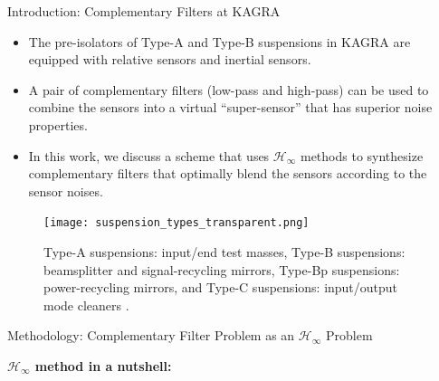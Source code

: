 \documentclass{beamer}
\begin{document}
\begin{frame}[t]
	\begin{columns}[t]
		
		\begin{column}{0.32\linewidth}	
			\begin{block}{Introduction: Complementary Filters at KAGRA}
				\begin{itemize}
					\item The pre-isolators of Type-A and Type-B suspensions in KAGRA are equipped with relative sensors and inertial sensors.
					\item A pair of complementary filters (low-pass and high-pass) can be used to combine the sensors into a virtual ``super-sensor'' that has superior noise properties.
					\item In this work, we discuss a scheme that uses $\mathcal{H}_\infty$ methods to synthesize  complementary filters that optimally blend the sensors according to the sensor noises.
				\end{itemize}
					
				\medskip

				\begin{figure}
					\centering
					\texttt{[image: suspension\_types\_transparent.png]}
					\caption{Type-A suspensions: input/end test masses, Type-B suspensions: beamsplitter and signal-recycling mirrors, Type-Bp suspensions: power-recycling mirrors, and Type-C suspensions: input/output mode cleaners \cite{Akutsu:2021auw}.}
					\label{fig:suspension_types}
				\end{figure}
			\end{block}
				
			\begin{block}{Methodology: Complementary Filter Problem as an $\mathcal{H}_\infty$ Problem}
				
					\textbf{$\mathcal{H}_\infty$ method in a nutshell:}


\end{block}
\end{column}
\end{columns}
\end{frame}
\end{document}
